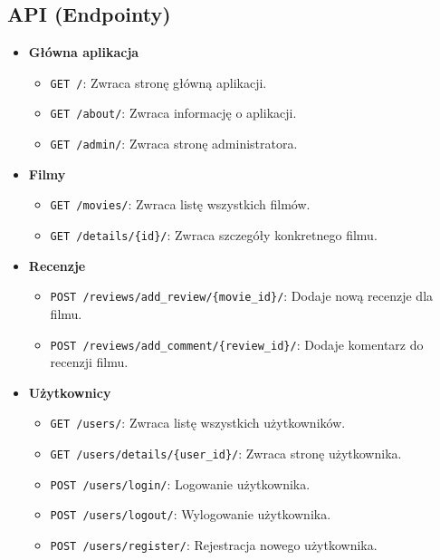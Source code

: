 \documentclass[../main.tex]{subfiles}
\begin{document}
\subsection{API (Endpointy)}
\begin{itemize}
	\item \textbf{Główna aplikacja}
	\begin{itemize}
		\item \texttt{GET \slash }: Zwraca stronę główną aplikacji.
		\item \texttt{GET \slash about\slash }: Zwraca informację o aplikacji.
		\item \texttt{GET \slash admin\slash }: Zwraca stronę administratora.
	\end{itemize}
	\item \textbf{Filmy}
	\begin{itemize}
		\item \texttt{GET \slash movies\slash }: Zwraca listę wszystkich filmów.
		\item \texttt{GET \slash details\slash \{id\}\slash }: Zwraca szczegóły konkretnego filmu.
	\end{itemize}
	\item \textbf{Recenzje}
	\begin{itemize}
		\item \texttt{POST \slash reviews\slash add\_review\slash \{movie\_id\}\slash }: Dodaje nową recenzje dla filmu.
		\item \texttt{POST \slash reviews\slash add\_comment\slash \{review\_id\}\slash }: Dodaje komentarz do recenzji filmu.
	\end{itemize}
	\item \textbf{Użytkownicy}
	\begin{itemize}
		\item \texttt{GET \slash users\slash }: Zwraca listę wszystkich użytkowników.
		\item \texttt{GET \slash users\slash details\slash \{user\_id\}\slash }: Zwraca stronę użytkownika.
		\item \texttt{POST \slash users\slash login\slash }: Logowanie użytkownika.
		\item \texttt{POST \slash users\slash logout\slash }: Wylogowanie użytkownika.
		\item \texttt{POST \slash users\slash register\slash }: Rejestracja nowego użytkownika.
	\end{itemize}
\end{itemize}
\end{document}
